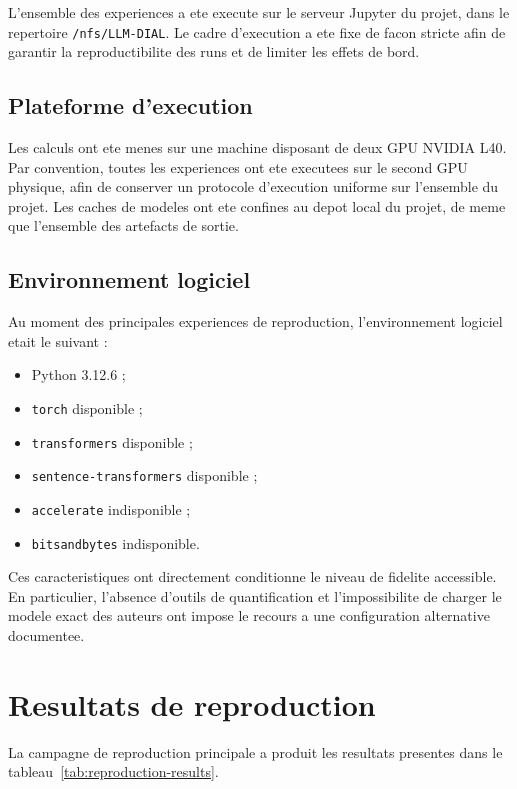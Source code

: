 L'ensemble des experiences a ete execute sur le serveur Jupyter du projet, dans
le repertoire \texttt{/nfs/LLM-DIAL}. Le cadre d'execution a ete fixe de facon
stricte afin de garantir la reproductibilite des runs et de limiter les effets
de bord.

\subsection{Plateforme d'execution}

Les calculs ont ete menes sur une machine disposant de deux GPU NVIDIA L40. Par
convention, toutes les experiences ont ete executees sur le second GPU
physique, afin de conserver un protocole d'execution uniforme sur l'ensemble du
projet. Les caches de modeles ont ete confines au depot local du projet, de
meme que l'ensemble des artefacts de sortie.

\subsection{Environnement logiciel}

Au moment des principales experiences de reproduction, l'environnement
logiciel etait le suivant :
\begin{itemize}[leftmargin=*]
  \item Python 3.12.6 ;
  \item \texttt{torch} disponible ;
  \item \texttt{transformers} disponible ;
  \item \texttt{sentence-transformers} disponible ;
  \item \texttt{accelerate} indisponible ;
  \item \texttt{bitsandbytes} indisponible.
\end{itemize}

Ces caracteristiques ont directement conditionne le niveau de fidelite
accessible. En particulier, l'absence d'outils de quantification et
l'impossibilite de charger le modele exact des auteurs ont impose le recours a
une configuration alternative documentee.

\section{Resultats de reproduction}

La campagne de reproduction principale a produit les resultats presentes dans
le tableau~\ref{tab:reproduction-results}.


